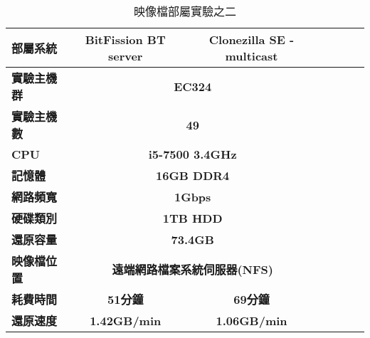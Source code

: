 \begin{table}[htbp]
\centering
\caption{映像檔部屬實驗之二}
\label{exp2}
\begin{adjustbox}{max width=0.92\textwidth}
\begin{tabular}{lcccccc}

\toprule
\multicolumn{1}{l}{\textbf{部屬系統}} & \textbf{BitFission BT server} & \textbf{Clonezilla SE - multicast} \\ \midrule
\multicolumn{1}{l}{\textbf{實驗主機群}} & \multicolumn{2}{c}{\textbf{EC324}} \\
\multicolumn{1}{l}{\textbf{實驗主機數}} & \multicolumn{2}{c}{\textbf{49}} \\
\multicolumn{1}{l}{\textbf{CPU}} & \multicolumn{2}{c}{\textbf{i5-7500 3.4GHz}} \\
\multicolumn{1}{l}{\textbf{記憶體}} & \multicolumn{2}{c}{\textbf{16GB DDR4}} \\
\multicolumn{1}{l}{\textbf{網路頻寬}} & \multicolumn{2}{c}{\textbf{1Gbps}} \\
\multicolumn{1}{l}{\textbf{硬碟類別}} & \multicolumn{2}{c}{\textbf{1TB HDD}} \\
\multicolumn{1}{l}{\textbf{還原容量}} & \multicolumn{2}{c}{\textbf{73.4GB}} \\
\multicolumn{1}{l}{\textbf{映像檔位置}} & \multicolumn{2}{c}{\textbf{遠端網路檔案系統伺服器(NFS)}} \\
\multicolumn{1}{l}{\textbf{耗費時間}} & \textbf{51分鐘} & \textbf{69分鐘} \\
\multicolumn{1}{l}{\textbf{還原速度}} & \textbf{1.42GB/min} & \textbf{1.06GB/min} \\

\bottomrule
\end{tabular}
\end{adjustbox}
\end{table}
